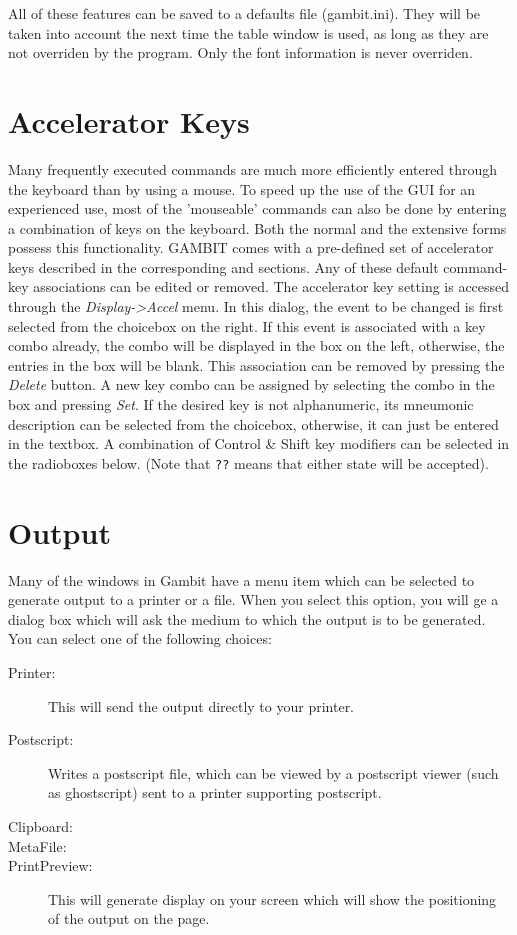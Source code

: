 All of these features can be saved to a defaults file (gambit.ini).  They
will be taken into account the next time the table window is used, as long
as they are not overriden by the program.  Only the font information is
never overriden.


\section{Accelerator Keys}\label{Accelerators}

Many frequently executed commands are much more efficiently entered
through the keyboard than by using a mouse.  To speed up the use of the
GUI for an experienced use, most of the 'mouseable' commands can also be
done by entering a combination of keys on the keyboard.  Both the normal
and the extensive forms possess this functionality.  GAMBIT comes with a
pre-defined set of accelerator keys described in the corresponding 
 and 
 sections.  Any of these default command-key
associations can be edited or removed.  The accelerator key setting is
accessed through the {\em Display->Accel} menu.  In this dialog, the event
to be changed is first selected from the choicebox on the right.  If this
event is associated with a key combo already, the combo will be displayed
in the box on the left, otherwise, the entries in the box will be blank.
This association can be removed by pressing the {\em Delete} button.  A
new key combo can be assigned by selecting the combo in the box and
pressing {\em Set}.  If the desired key is not alphanumeric, its mneumonic
description can be selected from the choicebox, otherwise, it can just be
entered in the textbox.  A combination of Control \& Shift key modifiers
can be selected in the radioboxes below.  (Note that \verb+??+  means that either
state will be accepted).

\section{Output}\label{outputsec}
Many of the windows in Gambit have a menu item which can be 
selected to generate output to a printer or a file.  When you select this 
option, you will ge a dialog box which will ask the medium to which the 
output is to be generated.  You can select one of the following 
choices:
\begin{description}
\item[Printer:] This will send the output directly to your printer. 
\item[Postscript:] Writes a postscript file, which can be viewed by a 
postscript viewer (such as ghostscript) sent to a printer 
supporting postscript.  
\item[Clipboard:] 
\item[MetaFile:]
\item[PrintPreview:]  This will generate display on your screen which will 
show the positioning of the output on the page.   
\end{description}

